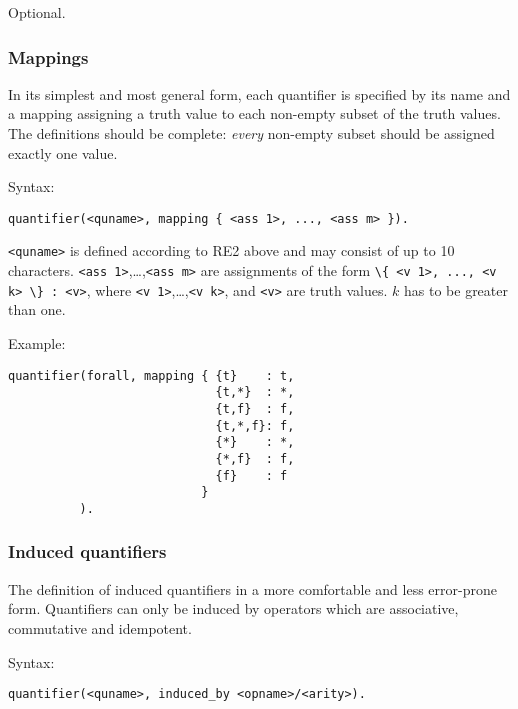 \documentclass[
]{article}
\newcommand{\passthrough}[1]{#1}
\begin{document}
Optional.

\hypertarget{mappings-1}{%
\subsubsection{Mappings}\label{mappings-1}}

In its simplest and most general form, each quantifier is specified by
its name and a mapping assigning a truth value to each non-empty subset
of the truth values. The definitions should be complete: \emph{every}
non-empty subset should be assigned exactly one value.

Syntax:

\begin{lstlisting}
quantifier(<quname>, mapping { <ass 1>, ..., <ass m> }).
\end{lstlisting}

\passthrough{\lstinline!<quname>!} is defined according to RE2 above and
may consist of up to 10 characters.
\passthrough{\lstinline!<ass 1>!},\ldots,\passthrough{\lstinline!<ass m>!}
are assignments of the form
\passthrough{\lstinline!\{ <v 1>, ..., <v k> \} : <v>!}, where
\passthrough{\lstinline!<v 1>!},\ldots,\passthrough{\lstinline!<v k>!},
and \passthrough{\lstinline!<v>!} are truth values. \(k\) has to be
greater than one.

Example:

\begin{lstlisting}
quantifier(forall, mapping { {t}    : t,
                             {t,*}  : *,
                             {t,f}  : f,
                             {t,*,f}: f,
                             {*}    : *,
                             {*,f}  : f,
                             {f}    : f
                           }
          ).
\end{lstlisting}

\hypertarget{induced-quantifiers}{%
\subsubsection{Induced quantifiers}\label{induced-quantifiers}}

The definition of induced quantifiers in a more comfortable and less
error-prone form. Quantifiers can only be induced by operators which are
associative, commutative and idempotent.

Syntax:

\begin{lstlisting}
quantifier(<quname>, induced_by <opname>/<arity>).
\end{lstlisting}
\end{document}
